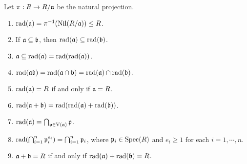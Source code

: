 \begin{fact}
    Let $\pi: R \to R/\mathfrak{a}$ be the natural projection.
    \begin{enumerate}
        \item $\operatorname{rad}(\mathfrak{a}) = \pi^{-1}(\operatorname{Nil}(R/\mathfrak{a})) \leq R$. 
        \item If $\mathfrak{a} \subseteq \mathfrak{b}$, then $\operatorname{rad}(\mathfrak{a}) \subseteq \operatorname{rad}(\mathfrak{b})$. 
        \item $\mathfrak{a} \subseteq \operatorname{rad}(\mathfrak{a}) = \operatorname{rad}(\operatorname{rad}(\mathfrak{a}))$. 
        \item $\operatorname{rad}(\mathfrak{a}\mathfrak{b}) = \operatorname{rad}(\mathfrak{a} \cap \mathfrak{b}) = \operatorname{rad}(\mathfrak{a}) \cap \operatorname{rad}(\mathfrak{b})$.
        \item $\operatorname{rad}(\mathfrak{a}) = R$ if and only if $\mathfrak{a} = R$.
        \item $\operatorname{rad}(\mathfrak{a} + \mathfrak{b}) = \operatorname{rad}(\operatorname{rad}(\mathfrak{a}) + \operatorname{rad}(\mathfrak{b}))$.
        \item $\operatorname{rad}(\mathfrak{a}) = \bigcap_{\mathfrak{p} \in \operatorname{V}(\mathfrak{a})} \mathfrak{p}$. 
        \item $\operatorname{rad}(\bigcap_{i=1}^n \mathfrak{p}_i^{e_i}) = \bigcap_{i=1}^n \mathfrak{p}_i$, where $\mathfrak{p}_i \in \operatorname{Spec}(R)$ and $e_i \geq 1$ for each $i = 1,\cdots,n$.
        \item $\mathfrak{a} + \mathfrak{b} = R$ if and only if $\operatorname{rad}(\mathfrak{a}) + \operatorname{rad}(\mathfrak{b}) = R$. 
    \end{enumerate}
\end{fact}

